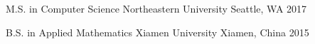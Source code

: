 


\begin{cvhonors}


	\cvhonor
	{M.S. in Computer Science} %
	{Northeastern University} %
	{Seattle, WA} %
	{2017} %


	\cvhonor
	{B.S. in Applied Mathematics} %
	{Xiamen University} %
	{Xiamen, China} %
	{2015} %


\end{cvhonors}